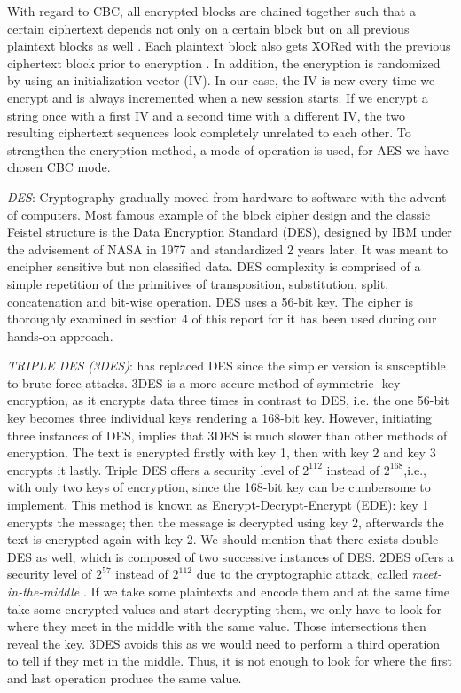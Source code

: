 With regard to CBC, all encrypted blocks are chained together such that a certain ciphertext depends not only on a certain block but on all previous plaintext blocks as well \cite{morris2001}. Each plaintext block also gets XORed with the previous ciphertext block prior to encryption \cite{morris2001}. In addition, the encryption is randomized by using an initialization vector (IV). In our case, the IV is new every time we encrypt and is always incremented when a new session starts. If we encrypt a string once with a first IV and a second time with a different IV, the two resulting ciphertext sequences look completely unrelated to each other. To strengthen the encryption method, a mode of operation is used, for AES we have chosen CBC mode. 

\textit{DES}: Cryptography gradually moved from hardware to software with the advent of computers. Most famous example of the block cipher design and the classic Feistel structure is the Data Encryption Standard (DES), designed by IBM under the advisement of NASA in 1977 and standardized 2 years later. It was meant to encipher sensitive but non classified data. DES complexity is comprised of a simple repetition of the primitives of transposition, substitution, split, concatenation and bit-wise operation. DES uses a 56-bit key. The cipher is thoroughly examined in section 4 of this report for it has been used during our hands-on approach.

\textit{TRIPLE DES (3DES)}: has replaced DES since the simpler version is susceptible to brute force attacks. 3DES is a more secure method of symmetric- key encryption, as it encrypts data three times in contrast to DES, i.e. the one 56-bit key becomes three individual keys rendering a 168-bit key. However, initiating three instances of DES, implies that 3DES is much slower than other methods of encryption. The text is encrypted firstly with key 1, then with key 2 and key 3 encrypts it lastly. Triple DES offers a security level of $2^{112}$ instead of $2^{168}$,i.e., with only two keys of encryption, since the 168-bit key can be cumbersome to implement. This method is known as Encrypt-Decrypt-Encrypt (EDE): key 1 encrypts the message; then the message is decrypted using key 2, afterwards the text is encrypted again with key 2. We should mention that there exists double DES as well, which is composed of two successive instances of DES. 2DES offers a security level of $2^{57}$ instead of $2^{112}$ due to the cryptographic attack, called \emph{meet-in-the-middle} \cite{mitm}. If we take some plaintexts and encode them and at the same time take some encrypted values and start decrypting them, we only have to look for where they meet in the middle with the same value. Those intersections then reveal the key. 3DES avoids this as we would need to perform a third operation to tell if they met in the middle. Thus, it is not enough to look for where the first and last operation produce the same value.

